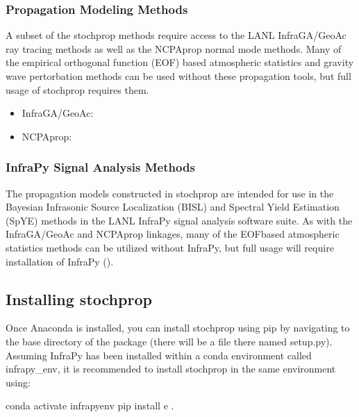 \documentclass[letterpaper,10pt,english]{sphinxmanual}
\begin{document}
\subsubsection{Propagation Modeling Methods}
\label{\detokenize{installation:propagation-modeling-methods}}
\sphinxAtStartPar
A subset of the stochprop methods require access to the  LANL InfraGA/GeoAc ray tracing methods as well as the NCPAprop normal mode methods.  Many of the
empirical orthogonal function (EOF) based atmospheric statistics and gravity wave pertorbation methods can be used without these propagation tools, but full usage of stochprop requires them.
\begin{itemize}
\item {} 
\sphinxAtStartPar
InfraGA/GeoAc: 

\item {} 
\sphinxAtStartPar
NCPAprop: 

\end{itemize}


\subsubsection{InfraPy Signal Analysis Methods}
\label{\detokenize{installation:infrapy-signal-analysis-methods}}
\sphinxAtStartPar
The propagation models constructed in stochprop are intended for use in the Bayesian Infrasonic Source Localization (BISL) and Spectral Yield Estimation (SpYE)
methods in the LANL InfraPy signal analysis software suite.  As with the InfraGA/GeoAc and NCPAprop linkages, many of the EOF\sphinxhyphen{}based atmospheric statistics methods
can be utilized without InfraPy, but full usage will require installation of InfraPy ().


\subsection{Installing stochprop}
\label{\detokenize{installation:installing-stochprop}}
\sphinxAtStartPar
Once Anaconda is installed, you can install stochprop using pip by navigating to the base directory of the package (there will be a file there
named setup.py).  Assuming InfraPy has been installed within a conda environment called infrapy\_env, it is recommended to install stochprop in the same environment using:

\begin{sphinxVerbatim}[commandchars=\\\{\}]
\PYGZgt{}\PYGZgt{} conda activate infrapy\PYGZus{}env
\PYGZgt{}\PYGZgt{} pip install \PYGZhy{}e .
\end{sphinxVerbatim}
\end{document}
